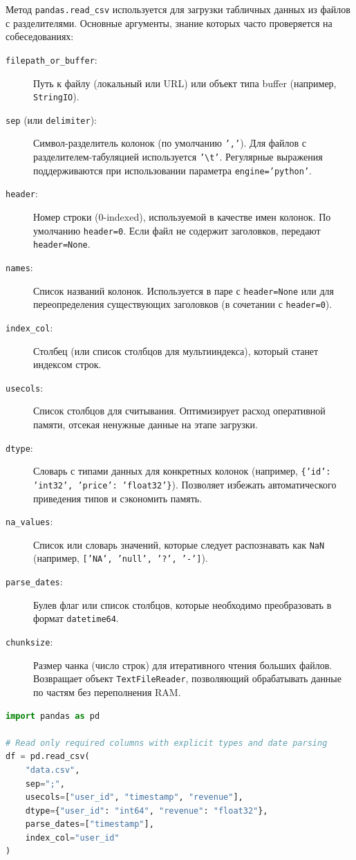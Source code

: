 \documentclass[12pt]{article}
\begin{document}
Метод \texttt{pandas.read\_csv} используется для загрузки табличных данных из файлов с разделителями. Основные аргументы, знание которых часто проверяется на собеседованиях:
\begin{description}
    \item[\texttt{filepath\_or\_buffer}:] Путь к файлу (локальный или URL) или объект типа buffer (например, \texttt{StringIO}).
    \item[\texttt{sep} (или \texttt{delimiter}):] Символ-разделитель колонок (по умолчанию \texttt{','}). Для файлов с разделителем-табуляцией используется \texttt{'\textbackslash t'}. Регулярные выражения поддерживаются при использовании параметра \texttt{engine='python'}.
    \item[\texttt{header}:] Номер строки (0-indexed), используемой в качестве имен колонок. По умолчанию \texttt{header=0}. Если файл не содержит заголовков, передают \texttt{header=None}.
    \item[\texttt{names}:] Список названий колонок. Используется в паре с \texttt{header=None} или для переопределения существующих заголовков (в сочетании с \texttt{header=0}).
    \item[\texttt{index\_col}:] Столбец (или список столбцов для мультииндекса), который станет индексом строк.
    \item[\texttt{usecols}:] Список столбцов для считывания. Оптимизирует расход оперативной памяти, отсекая ненужные данные на этапе загрузки.
    \item[\texttt{dtype}:] Словарь с типами данных для конкретных колонок (например, \texttt{\{'id': 'int32', 'price': 'float32'\}}). Позволяет избежать автоматического приведения типов и сэкономить память.
    \item[\texttt{na\_values}:] Список или словарь значений, которые следует распознавать как \texttt{NaN} (например, \texttt{['NA', 'null', '?', '-']}).
    \item[\texttt{parse\_dates}:] Булев флаг или список столбцов, которые необходимо преобразовать в формат \texttt{datetime64}.
    \item[\texttt{chunksize}:] Размер чанка (число строк) для итеративного чтения больших файлов. Возвращает объект \texttt{TextFileReader}, позволяющий обрабатывать данные по частям без переполнения RAM.
\end{description}

\begin{lstlisting}[language=Python, caption={Пример эффективного чтения данных}]
import pandas as pd

# Read only required columns with explicit types and date parsing
df = pd.read_csv(
    "data.csv",
    sep=";",
    usecols=["user_id", "timestamp", "revenue"],
    dtype={"user_id": "int64", "revenue": "float32"},
    parse_dates=["timestamp"],
    index_col="user_id"
)
\end{lstlisting}
\end{document}
